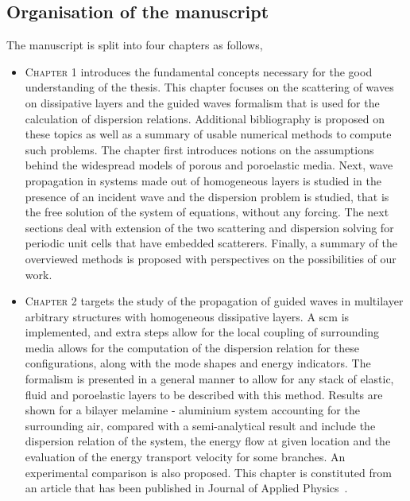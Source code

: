 \subsection*{Organisation of the manuscript}
The manuscript is split into four chapters as follows,
\begin{itemize}
    \item \textsc{Chapter} 1 introduces the fundamental concepts necessary for the good understanding of the thesis. This chapter focuses on the scattering of waves on dissipative layers and the guided waves formalism that is used for the calculation of dispersion relations. Additional bibliography is proposed on these topics as well as a summary of usable numerical methods to compute such problems. The chapter first introduces notions on the assumptions behind the widespread models of porous and poroelastic media. Next, wave propagation in systems made out of homogeneous layers is studied in the presence of an incident wave and the dispersion problem is studied, that is the free solution of the system of equations, without any forcing. The next sections deal with extension of the two scattering and dispersion solving for periodic unit cells that have embedded scatterers. Finally, a summary of the overviewed methods is proposed with perspectives on the possibilities of our work. \\
    
    \item \textsc{Chapter} 2 targets the study of the propagation of guided waves in multilayer arbitrary structures with homogeneous dissipative layers. A \acrfull{scm} is implemented, and extra steps allow for the local coupling of surrounding media allows for the computation of the dispersion relation for these configurations, along with the mode shapes and energy indicators. The formalism is presented in a general manner to allow for any stack of elastic, fluid and poroelastic layers to be described with this method. Results are shown for a bilayer melamine - aluminium system accounting for the surrounding air, compared with a semi-analytical result and include the dispersion relation of the system, the energy flow at given location and the evaluation of the energy transport velocity for some branches. An experimental comparison is also proposed. This chapter is constituted from an article that has been published in Journal of Applied Physics~\cite{marechal2025}. \\


\end{itemize}
